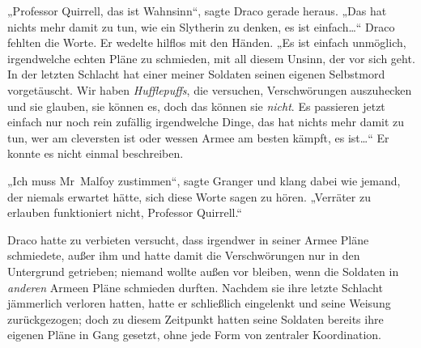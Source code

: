 „Professor Quirrell, das ist Wahnsinn“, sagte Draco gerade heraus. „Das hat nichts mehr damit zu tun, wie ein Slytherin zu denken, es ist einfach…“ Draco fehlten die Worte. Er wedelte hilflos mit den Händen. „Es ist einfach unmöglich, irgendwelche echten Pläne zu schmieden, mit all diesem Unsinn, der vor sich geht. In der letzten Schlacht hat einer meiner Soldaten seinen eigenen Selbstmord vorgetäuscht. Wir haben \emph{Hufflepuffs}, die versuchen, Verschwörungen auszuhecken und sie glauben, sie können es, doch das können sie \emph{nicht}. Es passieren jetzt einfach nur noch rein zufällig irgendwelche Dinge, das hat nichts mehr damit zu tun, wer am cleversten ist oder wessen Armee am besten kämpft, es ist…“ Er konnte es nicht einmal beschreiben.

„Ich muss Mr~Malfoy zustimmen“, sagte Granger und klang dabei wie jemand, der niemals erwartet hätte, sich diese Worte sagen zu hören. „Verräter zu erlauben funktioniert nicht, Professor Quirrell.“

Draco hatte zu verbieten versucht, dass irgendwer in seiner Armee Pläne schmiedete, außer ihm und hatte damit die Verschwörungen nur in den Untergrund getrieben; niemand wollte außen vor bleiben, wenn die Soldaten in \emph{anderen} Armeen Pläne schmieden durften. Nachdem sie ihre letzte Schlacht jämmerlich verloren hatten, hatte er schließlich eingelenkt und seine Weisung zurückgezogen; doch zu diesem Zeitpunkt hatten seine Soldaten bereits ihre eigenen Pläne in Gang gesetzt, ohne jede Form von zentraler Koordination.

